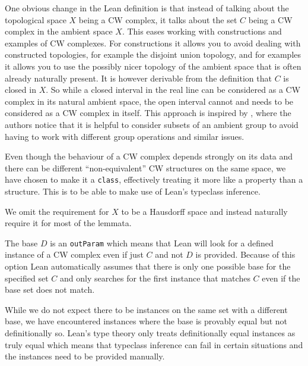 One obvious change in the Lean definition is that instead of talking about the topological space $X$ being a CW complex, it talks about the set $C$ being a CW complex in the ambient space $X$.
This eases working with constructions and examples of CW complexes. 
For constructions it allows you to avoid dealing with constructed topologies, for example the disjoint union topology, and for examples it allows you to use the possibly nicer topology of the ambient space that is often already naturally present. 
It is however derivable from the definition that $C$ is closed in $X$. 
So while a closed interval in the real line can be considered as a CW complex in its natural ambient space, the open interval cannot and needs to be considered as a CW complex in itself. 
This approach is inspired by \cite{Gonthier2013}, where the authors notice that it is helpful to consider subsets of an ambient group to avoid having to work with different group operations and similar issues.

Even though the behaviour of a CW complex depends strongly on its data and there can be different ``non-equivalent'' CW structures on the same space, we have chosen to make it a \lstinline|class|, effectively treating it more like a property than a structure. 
This is to be able to make use of Lean's typeclass inference. 

We omit the requirement for $X$ to be a Hausdorff space and instead naturally require it for most of the lemmata. 

The base $D$ is an \lstinline|outParam| which means that Lean will look for a defined instance of a CW complex even if just $C$ and not $D$ is provided. 
Because of this option Lean automatically assumes that there is only one possible base for the specified set $C$ and only searches for the first instance that matches $C$ even if the base set does not match. 


While we do not expect there to be instances on the same set with a different base, we have encountered instances where the base is provably equal but not definitionally so. 
Lean's type theory only treats definitionally equal instances as truly equal which means that typeclass inference can fail in certain situations and the instances need to be provided manually. 

